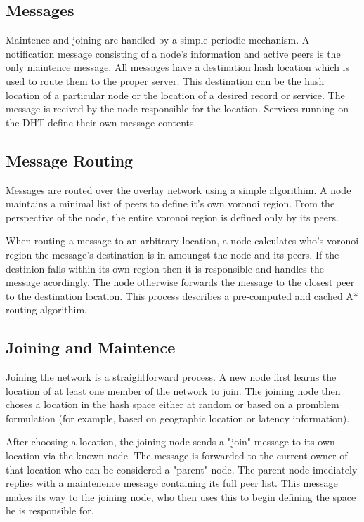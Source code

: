 \documentclass[11pt]{IEEEtran} %
\begin{document}
\subsection{Messages}
Maintence and joining are handled by a simple periodic mechanism. A notification message consisting of a node's information and active peers is the only maintence message. All messages have a destination hash location which is used to route them to the proper server. This destination can be the hash location of a particular node or the location of a desired record or service.  The message is recived by the node responsible for the location. Services running on the DHT define their own message contents.

\subsection{Message Routing}
Messages are routed over the overlay network using a simple algorithim. A node maintains a minimal list of peers to define it's own voronoi region.  From the perspective of the node, the entire voronoi region is defined only by its peers.

When routing a message to an arbitrary location, a node calculates who's voronoi region the message's destination is in amoungst the node and its peers. If the destinion falls within its own region then it is responsible and handles the message acordingly. The node otherwise forwards the message to the closest peer to the destination location. This process describes a pre-computed and cached A* \cite{astar} routing algorithim.

\subsection{Joining and Maintence}
Joining the network is a straightforward process. A new node first learns the location of at least one member of the network to join. The joining node then choses a location in the hash space either at random or based on a promblem formulation (for example, based on geographic location or latency information).

After choosing a location, the joining node sends a "join" message to its own location via the known node.
The message is forwarded to the current owner of that location who can be considered a "parent" node.
The parent node imediately replies with a maintenence message containing its full peer list. This message makes its way to the joining node, who then uses this to begin defining the space he is responsible for. 
\end{document}
